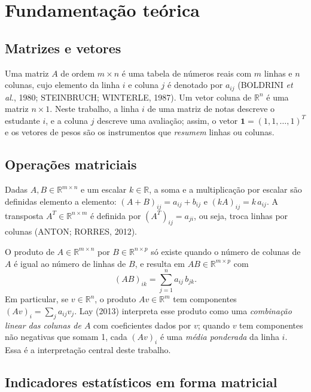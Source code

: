 \documentclass[12pt,a4paper]{article}
\newcommand{\R}{\mathbb{R}}
\begin{document}
\section{Fundamentação teórica}

\subsection{Matrizes e vetores}

Uma matriz $A$ de ordem $m\times n$ é uma tabela de números reais com $m$ linhas e $n$ colunas, cujo elemento da linha $i$ e coluna $j$ é denotado por $a_{ij}$ (BOLDRINI \textit{et al.}, 1980; STEINBRUCH; WINTERLE, 1987). Um vetor coluna de $\R^n$ é uma matriz $n\times 1$. Neste trabalho, a linha $i$ de uma matriz de notas descreve o estudante $i$, e a coluna $j$ descreve uma avaliação; assim, o vetor $\mathbf{1}=(1,1,\dots,1)^T$ e os vetores de pesos são os instrumentos que \emph{resumem} linhas ou colunas.

\subsection{Operações matriciais}

Dadas $A,B\in\R^{m\times n}$ e um escalar $k\in\R$, a soma e a multiplicação por escalar são definidas elemento a elemento: $(A+B)_{ij}=a_{ij}+b_{ij}$ e $(kA)_{ij}=k\,a_{ij}$. A transposta $A^T\in\R^{n\times m}$ é definida por $(A^T)_{ij}=a_{ji}$, ou seja, troca linhas por colunas (ANTON; RORRES, 2012).

O produto de $A\in\R^{m\times n}$ por $B\in\R^{n\times p}$ só existe quando o número de colunas de $A$ é igual ao número de linhas de $B$, e resulta em $AB\in\R^{m\times p}$ com
\begin{equation}
(AB)_{ik}=\sum_{j=1}^{n} a_{ij}\,b_{jk}.
\label{eq:produto}
\end{equation}
Em particular, se $v\in\R^{n}$, o produto $Av\in\R^m$ tem componentes $(Av)_i=\sum_j a_{ij}v_j$. Lay (2013) interpreta esse produto como uma \emph{combinação linear das colunas de $A$} com coeficientes dados por $v$; quando $v$ tem componentes não negativas que somam 1, cada $(Av)_i$ é uma \emph{média ponderada} da linha $i$. Essa é a interpretação central deste trabalho.

\subsection{Indicadores estatísticos em forma matricial}
\end{document}
